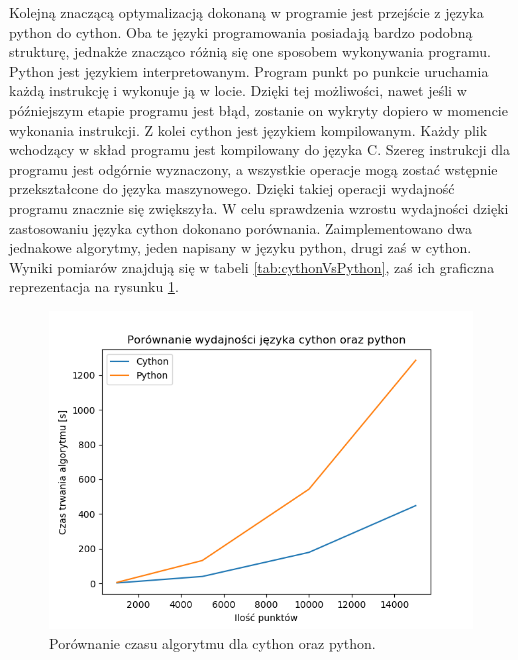 \newline \indent Kolejną znaczącą optymalizacją dokonaną w programie jest przejście z języka python do cython. Oba te języki programowania posiadają bardzo podobną strukturę, jednakże znacząco różnią się one sposobem wykonywania programu. Python jest językiem interpretowanym. Program punkt po punkcie uruchamia każdą instrukcję i wykonuje ją w locie. Dzięki tej możliwości, nawet jeśli w późniejszym etapie programu jest błąd, zostanie on wykryty dopiero w momencie wykonania instrukcji. Z kolei cython jest językiem kompilowanym. Każdy plik wchodzący w skład programu jest kompilowany do języka C. Szereg instrukcji dla programu jest odgórnie wyznaczony, a wszystkie operacje mogą zostać wstępnie przekształcone do języka maszynowego. Dzięki takiej operacji wydajność programu znacznie się zwiększyła. W celu sprawdzenia wzrostu wydajności dzięki zastosowaniu języka cython dokonano porównania. Zaimplementowano dwa jednakowe algorytmy, jeden napisany w języku python, drugi zaś w cython. Wyniki pomiarów znajdują się w tabeli \ref{tab:cythonVsPython}, zaś ich graficzna reprezentacja na rysunku \ref{fig:pytcytpic}.
\begin{figure}[H]
  \centering
  \includegraphics[scale=0.48]{pythonvscython.png}
  \caption{Porównanie czasu algorytmu dla cython oraz python.}   
  \label{fig:pytcytpic}
\end{figure}
